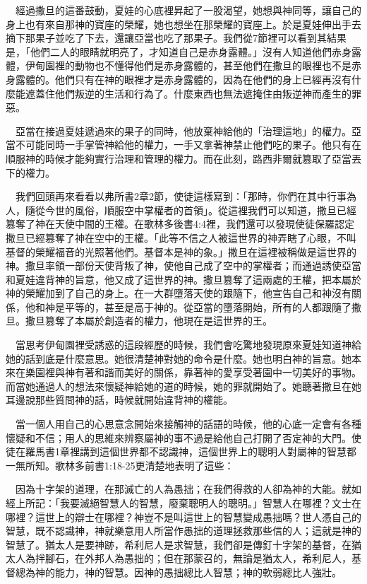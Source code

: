 \documentclass{book}
\begin{document}
　經過撒旦的這番鼓動，夏娃的心底裡昇起了一股渴望，她想與神同等，讓自己的身上也有來自那神的寶座的榮耀，她也想坐在那榮耀的寶座上。於是夏娃伸出手去摘下那果子並吃了下去，還讓亞當也吃了那果子。我們從7節裡可以看到其結果是，「他們二人的眼睛就明亮了，才知道自己是赤身露體。」沒有人知道他們赤身露體，伊甸園裡的動物也不懂得他們是赤身露體的，甚至他們在撒旦的眼裡也不是赤身露體的。他們只有在神的眼裡才是赤身露體的，因為在他們的身上已經再沒有什麼能遮蓋住他們叛逆的生活和行為了。什麼東西也無法遮掩住由叛逆神而產生的罪惡。

　亞當在接過夏娃遞過來的果子的同時，他放棄神給他的「治理這地」的權力。亞當不可能同時一手掌管神給他的權力，一手又拿著神禁止他們吃的果子。他只有在順服神的時候才能夠實行治理和管理的權力。而在此刻，路西非爾就篡取了亞當丟下的權力。

　我們回頭再來看看以弗所書2章2節，使徒這樣寫到：「那時，你們在其中行事為人，隨從今世的風俗，順服空中掌權者的首領」。從這裡我們可以知道，撒旦已經篡奪了神在天使中間的王權。在歌林多後書4:4裡，我們還可以發現使徒保羅認定撒旦已經篡奪了神在空中的王權。「此等不信之人被這世界的神弄瞎了心眼，不叫基督的榮耀福音的光照著他們。基督本是神的象。」撒旦在這裡被稱做是這世界的神。撒旦率領一部份天使背叛了神，使他自己成了空中的掌權者；而通過誘使亞當和夏娃違背神的旨意，他又成了這世界的神。撒旦篡奪了這兩處的王權，把本屬於神的榮耀加到了自己的身上。在一大群墮落天使的跟隨下，他宣告自己和神沒有關係，他和神是平等的，甚至是高于神的。從亞當的墮落開始，所有的人都跟隨了撒旦。撒旦篡奪了本屬於創造者的權力，他現在是這世界的王。

　當思考伊甸園裡受誘惑的這段經歷的時候，我們會吃驚地發現原來夏娃知道神給她的話到底是什麼意思。她很清楚神對她的命令是什麼。她也明白神的旨意。她本來在樂園裡與神有著和諧而美好的關係，靠著神的愛享受著園中一切美好的事物。而當她通過人的想法來懷疑神給她的道的時候，她的罪就開始了。她聽著撒旦在她耳邊說那些質問神的話，時候就開始違背神的權能。

　當一個人用自己的心思意念開始來接觸神的話語的時候，他的心底一定會有各種懷疑和不信；用人的思維來辨察屬神的事不過是給他自己打開了否定神的大門。使徒在羅馬書1章裡講到這個世界都不認識神，這個世界上的聰明人對屬神的智慧都一無所知。歌林多前書1:18-25更清楚地表明了這些：

　因為十字架的道理，在那滅亡的人為愚拙；在我們得救的人卻為神的大能。就如經上所記：「我要滅絕智慧人的智慧，廢棄聰明人的聰明。」智慧人在哪裡？文士在哪裡？這世上的辯士在哪裡？神豈不是叫這世上的智慧變成愚拙嗎？世人憑自己的智慧，既不認識神，神就樂意用人所當作愚拙的道理拯救那些信的人；這就是神的智慧了。猶太人是要神跡，希利尼人是求智慧，我們卻是傳釘十字架的基督，在猶太人為拌腳石，在外邦人為愚拙的；但在那蒙召的，無論是猶太人，希利尼人，基督總為神的能力，神的智慧。因神的愚拙總比人智慧；神的軟弱總比人強壯。
\end{document}
